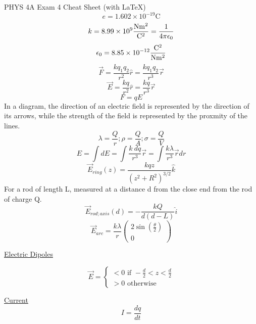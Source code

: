 \documentclass[8pt]{minimal}
\begin{document}
\setlength{\parindent}{0pt}
\setlength{\columnsep}{1cm}
\twocolumn
PHYS 4A Exam 4 Cheat Sheet (with \LaTeX)
\[ e = 1.602 \times 10^{-19} \unit{\coulomb} \]
\[ k = 8.99 \times 10^9 \unit{\frac{\newton\meter^2}{\coulomb^2}}= \frac{1}{4\pi\epsilon_0} \]
\[ \epsilon_0 = 8.85 \times 10^{-12} \unit{\frac{\coulomb^2}{\newton\meter^2}} \]
\[\vec{F} = \frac{kq_1q_2}{r^2}\hat{r} = \frac{kq_1q_2}{r^3}\vec{r}\]
\[\vec{E} = \frac{kq}{r^2}\hat{r} = \frac{kq}{r^3}\vec{r}\]
\[F = qE\]
In a diagram, the direction of an electric field is represented by the direction of its arrows, while the strength of the field is represented by the proxmity of the lines.
\[\lambda = \frac{Q}{r} ; \rho = \frac{Q}{A} ; \sigma = \frac{Q}{V}\]
\[E = \int dE = \int \frac{k\ dq}{r^3}\vec{r} = \int \frac{k \lambda}{r^3}\vec{r}dr\]
\[ \vec{E}_{ring}(z) = \frac{kqz}{(z^2 + R^2)^{3/2}}\hat{k} \]
For a rod of length L, measured at a distance d from the close end from the rod of charge Q.
\[ \vec{E}_{rod;axis}(d) = -\frac{kQ}{d(d-L)}\hat{i} \]
\[ \vec{E}_{arc} = \frac{k\lambda}{r} \begin{pmatrix}2\sin(\frac{\theta}{2})\\0\end{pmatrix} \]

\underline{Electric Dipoles}

\[\vec{E} = \left\{ \begin{matrix}
    < 0 \text{ if } -\frac{d}{2} < z < \frac{d}{2}\\
    > 0 \text{ otherwise}
\end{matrix} \right. \]

\underline{Current}
\[ I = \frac{dq}{dt} \]
\end{document}

